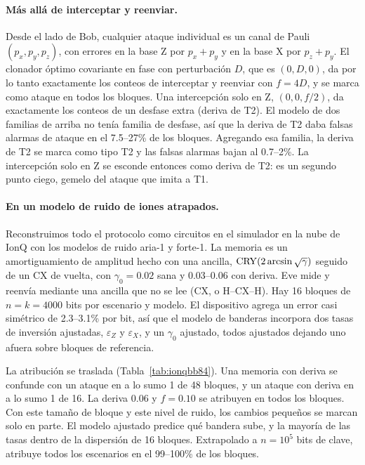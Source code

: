 \documentclass[11pt]{article}
\begin{document}
\paragraph{Más allá de interceptar y reenviar.} Desde el lado de Bob, cualquier ataque individual es un
canal de Pauli $(p_x,p_y,p_z)$, con errores en la base Z por $p_x+p_y$ y en la base X por $p_z+p_y$. El
clonador óptimo covariante en fase con perturbación $D$, que es $(0,D,0)$, da por lo tanto exactamente los
conteos de interceptar y reenviar con $f=4D$, y se marca como ataque en todos los bloques. Una intercepción
solo en Z, $(0,0,f/2)$, da exactamente los conteos de un desfase extra (deriva de T2). El modelo de dos
familias de arriba no tenía familia de desfase, así que la deriva de T2 daba falsas alarmas de ataque en el
7.5--27\% de los bloques. Agregando esa familia, la deriva de T2 se marca como tipo T2 y las falsas
alarmas bajan al 0.7--2\%. La intercepción solo en Z se esconde entonces como deriva de T2: es un segundo
punto ciego, gemelo del ataque que imita a T1.

\paragraph{En un modelo de ruido de iones atrapados.} Reconstruimos todo el protocolo como circuitos en el
simulador en la nube de IonQ con los modelos de ruido aria-1 y forte-1. La memoria es un amortiguamiento
de amplitud hecho con una ancilla, ${\rm CRY}(2\arcsin\sqrt\gamma)$ seguido de un CX de vuelta, con
$\gamma_0=0.02$ sana y 0.03--0.06 con deriva. Eve mide y reenvía mediante una ancilla que no se lee (CX, o
H--CX--H). Hay 16 bloques de $n=k=4000$ bits por escenario y modelo. El dispositivo agrega un error casi
simétrico de 2.3--3.1\% por bit, así que el modelo de banderas incorpora dos tasas de inversión ajustadas,
$\varepsilon_Z$ y $\varepsilon_X$, y un $\gamma_0$ ajustado, todos ajustados dejando uno afuera sobre bloques
de referencia.

La atribución se traslada (Tabla~\ref{tab:ionqbb84}). Una memoria con deriva se confunde con un ataque en
a lo sumo 1 de 48 bloques, y un ataque con deriva en a lo sumo 1 de 16. La deriva 0.06 y $f=0.10$ se
atribuyen en todos los bloques. Con este tamaño de bloque y este nivel de ruido, los cambios pequeños se
marcan solo en parte. El modelo ajustado predice qué bandera sube, y la mayoría de las tasas dentro de la
dispersión de 16 bloques. Extrapolado a $n=10^5$ bits de clave, atribuye todos los escenarios en el
99--100\% de los bloques.
\end{document}
